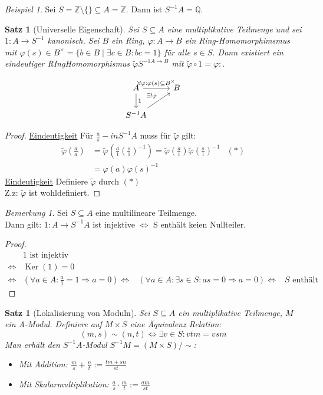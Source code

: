 \documentclass[10pt,a4paper]{article}
\newcommand{\Z}{\ensuremath{\mathbb{Z}}}
\newcommand{\Q}{\ensuremath{\mathbb{Q}}}
\newcommand{\Ker}{\ensuremath{\operatorname{Ker}}}
\newcounter{thm}[section]
\theoremstyle{definition}
\theoremstyle{plain}
\newtheorem{satz}[thm]{Satz}
\theoremstyle{remark}
\newtheorem{bem}[thm]{Bemerkung}
\newtheorem*{exm*}{Beispiel}
\begin{document}
\begin{exm*}
	Sei $S=\Z\setminus \{\}\subseteq A=\Z$. Dann ist $S^{-1}A=\Q$.
\end{exm*}

\begin{satz}[Universelle Eigenschaft]
	Sei $S\subseteq A$ eine multiplikative Teilmenge und sei $1:A\rightarrow S^{-1}$ kanonisch. Sei $B$ ein Ring, $\varphi:A\rightarrow B$ ein Ring-Homomorphimsmus mit $\varphi(s)\in B^\times=\{b\in B\mid  \exists c\in B: bc=1\}$ für alle $s\in S$. Dann existiert ein eindeutiger RIngHomomorphismus $\tilde{\varphi}S^{-1 A\rightarrow B}$ mit $\tilde{\varphi}\circ 1=\varphi:$.
	
	\[
		\begin{tikzcd}
		A\ar{r}{\forall\varphi:\varphi(s)\subseteq B^\times}\ar{d}{1} & B\\
		S^{-1}A\ar{ru}{\exists!\tilde\varphi} &
		\end{tikzcd}
	\]
\end{satz}
\begin{proof}
	\underline{Eindeutigkeit} Für $\frac{a}{s}-in S^{-1}A$ muss für $\tilde{\varphi}$ gilt:
	\begin{align*}
	\tilde\varphi\left(\frac{a}{a}\right)&=\tilde{\varphi}\left(\frac{a}{1}\left(\frac{s}{1}\right)^{-1}\right)=\tilde{\varphi}\left(\frac{a}{1}\right)\tilde{\varphi}\left(\frac{s}{1}\right)^{-1}&(*)\\
	&=\varphi(a)\varphi(s)^{-1}
	\end{align*}
	\underline{Eindeutigkeit}
	Definiere $\tilde\varphi$ durch $(*)$\\
	Z.z: $\tilde\varphi$ ist wohldefiniert.
\end{proof}
\begin{bem}
	Sei $S\subseteq A$ eine multilineare Teilmenge.\\
	Dann gilt: $1:A\rightarrow S^{-1}A$ ist injektive $\Leftrightarrow$ S enthält keien Nullteiler.
\end{bem}
\begin{proof}
	\begin{align*}
	&1\text{ ist injektiv }\\
	\Leftrightarrow&\Ker(1)=0\\
	\Leftrightarrow&(\forall a\in A:\frac{a}{1}=1\Rightarrow a=0)
	\Leftrightarrow&(\forall a\in A:\exists s\in S:as=0\Rightarrow a=0)
	\Leftrightarrow&\text{$S$ enthält eine Nullteiler}
	\end{align*}
\end{proof}
\begin{satz}[Lokalisierung von Moduln]
	Sei $S\subseteq A$ ein multiplikative Teilmenge, $M$ ein A-Modul. Definiere auf $M\times S$ eine Äquivalenz Relation:
	\[(m,s)\sim (n,t)\Leftrightarrow\exists v\in S:vtm=vsm\]
	Man erhält den $S^{-1}A$-Modul $S^{-1}M=(M\times S)/\sim$:
	\begin{itemize}
		\item Mit Addition: $\frac{m}{s}+\frac{n}{t}:=\frac{tm+sn}{st}$
		\item Mit Skalarmultiplikation: $\frac{a}{s}\cdot \frac{m}{t}:=\frac{am}{st}$
	\end{itemize}
\end{satz}
\end{document}
